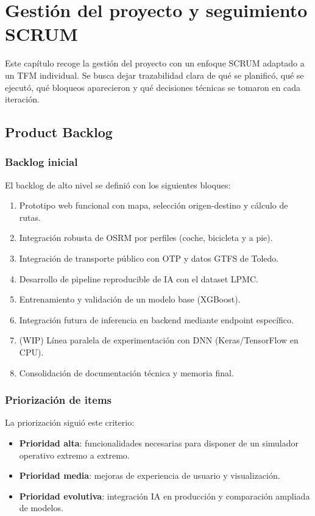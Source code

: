 \chapter{Gestión del proyecto y seguimiento SCRUM}

Este capítulo recoge la gestión del proyecto con un enfoque SCRUM adaptado a un TFM individual. Se busca dejar trazabilidad clara de qué se planificó, qué se ejecutó, qué bloqueos aparecieron y qué decisiones técnicas se tomaron en cada iteración.

\section{Product Backlog}

\subsection{Backlog inicial}

El backlog de alto nivel se definió con los siguientes bloques:

\begin{enumerate}
  \item Prototipo web funcional con mapa, selección origen-destino y cálculo de rutas.
  \item Integración robusta de OSRM por perfiles (coche, bicicleta y a pie).
  \item Integración de transporte público con OTP y datos GTFS de Toledo.
  \item Desarrollo de pipeline reproducible de IA con el dataset LPMC.
  \item Entrenamiento y validación de un modelo base (XGBoost).
  \item Integración futura de inferencia en backend mediante endpoint específico.
  \item (WIP) Línea paralela de experimentación con DNN (Keras/TensorFlow en CPU).
  \item Consolidación de documentación técnica y memoria final.
\end{enumerate}

\subsection{Priorización de items}

La priorización siguió este criterio:

\begin{itemize}
  \item \textbf{Prioridad alta}: funcionalidades necesarias para disponer de un simulador operativo extremo a extremo.
  \item \textbf{Prioridad media}: mejoras de experiencia de usuario y visualización.
  \item \textbf{Prioridad evolutiva}: integración IA en producción y comparación ampliada de modelos.
\end{itemize}

